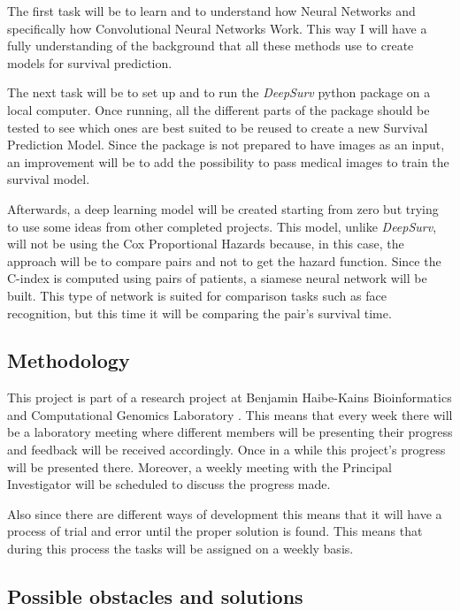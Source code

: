 The first task will be to learn and to understand how Neural Networks and specifically how 
Convolutional Neural Networks Work. This way I will have a fully understanding of the background
that all these methods use to create models for survival prediction.

The next task will be to set up and to run the \emph{DeepSurv} python package on a local
computer. Once running, all the different parts of the package should be tested to see which
ones are best suited to be reused to create a new Survival Prediction Model. Since the package
is not prepared to have images as an input, an improvement will be to add the possibility to 
pass medical images to train the survival model.
\cite{medical:deep-surv-github}

Afterwards, a deep learning model will be created starting from zero but trying to use 
some ideas from other completed projects. This model, unlike \emph{DeepSurv}, will not be 
using the Cox Proportional Hazards because, in this case, the approach will be to compare
pairs and not to get the hazard function. Since the C-index is computed using pairs of patients, 
a siamese neural network will be built. This type of network is suited for comparison 
tasks such as face recognition, but this time it will be comparing the pair's survival time.

\subsection{Methodology}

This project is part of a research project at Benjamin Haibe-Kains Bioinformatics and 
Computational Genomics Laboratory \cite{bhklab}. This means that every week there will be a 
laboratory meeting where different members will be presenting their progress and feedback will
be received accordingly. Once in a while this project's progress will be presented there.
Moreover, a weekly meeting with the Principal Investigator will be scheduled to discuss
the progress made.

Also since there are different ways of development this means that it will have a process of trial
and error until the proper solution is found. This means that during this process the
tasks will be assigned on a weekly basis.


\subsection{Possible obstacles and solutions}

